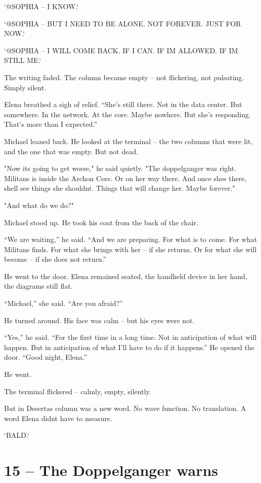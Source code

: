 \documentclass[
]{article}
\begin{document}
`@SOPHIA -- I KNOW.`

`@SOPHIA -- BUT I NEED TO BE ALONE. NOT FOREVER. JUST FOR NOW.`

`@SOPHIA -- I WILL COME BACK. IF I CAN. IF I\textquotesingle M ALLOWED. IF I\textquotesingle M STILL ME.`

The writing faded. The column became empty -- not flickering, not pulsating. Simply silent.

Elena breathed a sigh of relief. ``She's still there. Not in the data center. But somewhere. In the network. At the core. Maybe nowhere. But she's responding. That's more than I expected.''

Michael leaned back. He looked at the terminal -- the two columns that were lit, and the one that was empty. But not dead.

"Now it\textquotesingle s going to get worse," he said quietly. "The doppelganger was right. Militans is inside the Archon Core. Or on her way there. And once she\textquotesingle s there, she\textquotesingle ll see things she shouldn\textquotesingle t. Things that will change her. Maybe forever."

"And what do we do?"

Michael stood up. He took his coat from the back of the chair.

``We are waiting,'' he said. ``And we are preparing. For what is to come. For what Militans finds. For what she brings with her -- if she returns. Or for what she will become -- if she does not return.''

He went to the door. Elena remained seated, the handheld device in her hand, the diagrams still flat.

``Michael,'' she said. ``Are you afraid?''

He turned around. His face was calm -- but his eyes were not.

``Yes,'' he said. ``For the first time in a long time. Not in anticipation of what will happen. But in anticipation of what I'll have to do if it happens.'' He opened the door. ``Good night, Elena.''

He went.

The terminal flickered -- calmly, empty, silently.

But in Deserta\textquotesingle s column was a new word. No wave function. No translation. A word Elena didn\textquotesingle t have to measure.

`BALD.`

\section{15 -- The Doppelganger warns}\label{the-doppelganger-warns}
\end{document}
